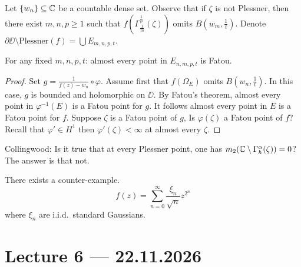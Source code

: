 Let $\{ w_n \} \subseteq \mathbb{C}$ be a countable dense set.
Observe that if $\zeta$ is not Plessner, then there exist $m, n, p \ge 1$ such that $f(\Gamma_{\frac{1}{m}}^{\frac{1}{p}}(\zeta))$ omits $B(w_m, \frac{1}{t})$.
Denote $\partial \DD \setminus \text{Plessner}(f) = \bigcup E_{m, n, p, t}$.
\begin{proposition}
	For any fixed $m, n, p, t$: almost every point in $E_{n, m, p, t}$ is Fatou.
\end{proposition}
\begin{proof}
	Set $g = \frac{1}{f(z) - w_n} \circ \varphi$.
	Assume first that $f(\Omega_E)$ omits $B(w_n, \frac{1}{t})$.
	In this case, $g$ is bounded and holomorphic on $\DD$.
	By Fatou's theorem, almost every point in $\varphi^{-1}(E)$ is a Fatou point for $g$.
	It follows almost every point in $E$ is a Fatou point for $f$.
	Suppose $\zeta$ is a Fatou point of $g$, Is $\varphi(\zeta)$ a Fatou point of $f$?
	Recall that $\varphi' \in H^1$ then $\varphi'(\zeta) < \infty$ at almost every $\zeta$.
\end{proof}
Collingwood: Is it true that at every Plessner point, one has $m_2(\mathbb{C} \setminus \Gamma_h^{\alpha}(\zeta)) = 0$?
The answer is that not.
\begin{theorem}
	There exists a counter-example.
	\[
		f(z)
		= \sum_{n = 0}^\infty \frac{\xi_n}{\sqrt{n}} z^{2^n}
	\]
	where $\xi_n$ are i.i.d.\ standard Gaussians.
\end{theorem}

\section{Lecture 6 --- 22.11.2026}
